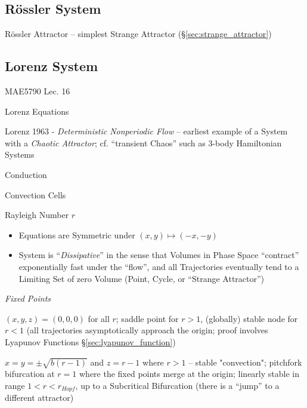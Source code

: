 \subsection{R\"ossler System}\label{sec:rossler_system}

R\"ossler Attractor --
simplest Strange Attractor (\S\ref{sec:strange_attractor})



\subsection{Lorenz System}\label{sec:lorenz_system}

MAE5790 Lec. 16

Lorenz Equations

Lorenz 1963 - \emph{Deterministic Nonperiodic Flow} -- earliest example of a
System with a \emph{Chaotic Attractor}; cf. ``transient Chaos'' such as 3-body
Hamiltonian Systems

Conduction

Convection Cells

Rayleigh Number $r$

\begin{itemize}
  \item Equations are Symmetric under $(x,y) \mapsto (-x,-y)$
  \item System is ``\emph{Dissipative}'' in the sense that Volumes in Phase
    Space ``contract'' exponentially fast under the ``flow'', and all
    Trajectories eventually tend to a Limiting Set of zero Volume (Point, Cycle,
    or ``Strange Attractor'')
\end{itemize}

\emph{Fixed Points}

$(x,y,z) = (0,0,0)$ for all $r$; saddle point for $r > 1$, (globally) stable
node for $r < 1$ (all trajectories asymptotically approach the origin; proof
involves Lyapunov Functions \S\ref{sec:lyapunov_function})

$x = y = \pm\sqrt{b(r-1)}$ and $z = r-1$ where $r > 1$ -- stable "convection";
pitchfork bifurcation at $r=1$ where the fixed points merge at the origin;
linearly stable in range $1 < r < r_{Hopf}$, up to a Subcritical Bifurcation
(there is a ``jump'' to a different attractor)

